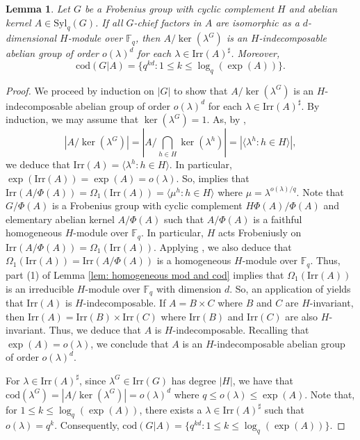 \documentclass[9pt]{article}
\newtheorem{lem}{\bf Lemma}[section]
\begin{document}
\begin{lem}\label{lem: frob, abel ker, general case, cod}
	Let $G$ be a Frobenius group with cyclic complement $H$ and abelian kernel $A\in \mathrm{Syl}_{q}(G)$.
    If all $G$-chief factors in $A$ are isomorphic as a $d$-dimensional $H$-module over $\mathbb{F}_q$,
        then $A/\ker(\lambda^{G})$ is an $H$-indecomposable abelian group of order $o(\lambda)^{d}$ for each $\lambda\in \mathrm{Irr}(A)^\sharp$. 
		Moreover, 
		$$\mathrm{cod}(G|A)=\{ q^{kd} : 1\leq k\leq \log_{q}(\exp(A)) \}.$$
\end{lem}
\begin{proof}
	We proceed by induction on $|G|$
	to show that $A/\ker(\lambda^{G})$ is an $H$-indecomposable abelian group of order $o(\lambda)^{d}$ for each $\lambda\in \mathrm{Irr}(A)^\sharp$.
	By induction, we may assume that $\ker(\lambda^G)=1$.
    As, by \cite[\S 5, Theorem 5.5]{huppertcharactertheory},
	$$|A/\ker(\lambda^G)|=|A/\bigcap_{h\in H}\ker(\lambda^h)|=|\langle \lambda^{h}:h\in H\rangle|,$$ 
	we deduce that $\mathrm{Irr}(A)=\langle \lambda^{h}:h\in H\rangle$.
	In particular, $\exp (\mathrm{Irr}(A))=\exp(A)=o(\lambda)$.
    So, \cite[\S 5, Proposition 5.8]{huppertcharactertheory} implies that $\mathrm{Irr}(A/\Phi(A))=\Omega_1(\mathrm{Irr}(A))=\langle \mu^h:h\in H\rangle$ where $\mu=\lambda^{o(\lambda)/q}$.
    Note that $G/\Phi(A)$ is a Frobenius group with cyclic complement $H\Phi(A)/\Phi(A)$ and elementary abelian kernel $A/\Phi(A)$ such that $A/\Phi(A)$ is a faithful homogeneous $H$-module over $\mathbb{F}_q$.
    In particular, $H$ acts Frobeniusly on $\mathrm{Irr}(A/\Phi(A))=\Omega_1(\mathrm{Irr}(A))$.
	Applying \cite[Lemma 1]{zhang2000},
	we also deduce that $\Omega_1(\mathrm{Irr}(A))=\mathrm{Irr}(A/\Phi(A))$ is a homogeneous $H$-module over $\mathbb{F}_q$.
	Thus, part (1) of Lemma \ref{lem: homogeneous mod and cod} implies that $\Omega_1(\mathrm{Irr}(A))$ is an irreducible $H$-module over $\mathbb{F}_q$ with dimension $d$.
	So, an application of \cite[Theorem]{harris1977} yields that $\mathrm{Irr}(A)$ is $H$-indecomposable.
    If $A=B\times C$ where $B$ and $C$ are $H$-invariant,
	then $\mathrm{Irr}(A)=\mathrm{Irr}(B)\times \mathrm{Irr}(C)$ where $\mathrm{Irr}(B)$ and $\mathrm{Irr}(C)$ 
	are also $H$-invariant.
	Thus, we deduce that $A$ is $H$-indecomposable.
    Recalling that $\exp(A)=o(\lambda)$, we conclude that $A$ is an $H$-indecomposable abelian group of order $o(\lambda)^{d}$.

    For $\lambda\in \mathrm{Irr}(A)^\sharp$, since $\lambda^{G}\in \mathrm{Irr}(G)$ has degree $|H|$,
	we have that $\mathrm{cod}(\lambda^{G})=|A/\ker(\lambda^{G})|=o(\lambda)^{d}$ where $q\leq o(\lambda)\leq \exp(A)$.
    Note that, for $1\leq k\leq \log_q(\exp(A))$, there exists a $\lambda\in \mathrm{Irr}(A)^\sharp$ such that $o(\lambda)=q^{k}$.
    Consequently, $\mathrm{cod}(G|A)=\{ q^{kd} : 1\leq k\leq \log_{q}(\exp(A)) \}$.
\end{proof}
\end{document}
